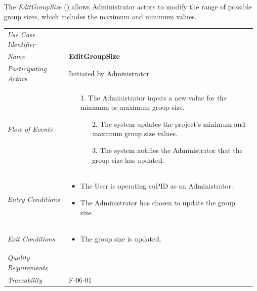 \documentclass[12pt,letterpaper]{article}
\begin{document}
\vspace{1em}
The {\it EditGroupSize} ({\bf \editgroupsize{}}) allows Administrator actors to modify the range of possible group sizes, which includes the maximum and minimum values.

\begin{center}
	\begin{tabu} to 
		\toprule
		Use Case Identifier & \editgroupsize{} \\
		Name & {\bf EditGroupSize} \\
		Participating Actors & Initiated by Administrator \\
		Flow of Events & 
		\begin{minipage}[t]{\linewidth}
		    \begin{enumerate}
			    \item[1.] The Administrator inputs a new value for the minimum or maximum group size.
			    \begin{enumerate}
			        \item[2.] The system updates the project's minimum and maximum group size values.
			        \item[3.] The system notifies the Administrator that the group size has updated.
			    \end{enumerate}
			\end{enumerate}
		\end{minipage} \\

		Entry Conditions &
		\begin{minipage}[t]{\linewidth}
			\begin{itemize}
			    \item The User is operating cuPID as an Administrator.
			    \item The Administrator has chosen to update the group size.
	        \end{itemize}
		\end{minipage} \\

		Exit Conditions &
		\begin{minipage}[t]{\linewidth}
			\begin{itemize}
			    \item The group size is updated.
	        \end{itemize}
		\end{minipage} \\

		Quality Requirements & \\

		Traceability & F-06-01 \\
		\toprule
	\end{tabu}
\end{center}
\end{document}
